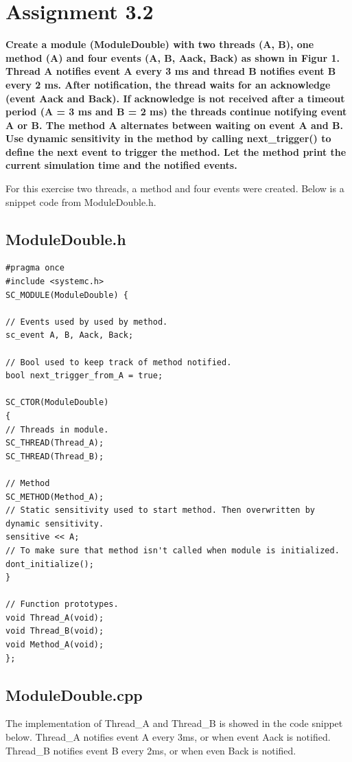 
\chapter{Assignment 3.2}

\textbf{Create a module (ModuleDouble) with two threads (A, B), one method (A) and four events (A,
	B, Aack, Back) as shown in Figur 1. Thread A notifies event A every 3 ms and thread B notifies
	event B every 2 ms. After notification, the thread waits for an acknowledge (event Aack and Back).
	If acknowledge is not received after a timeout period (A = 3 ms and B = 2 ms) the threads continue
	notifying event A or B. The method A alternates between waiting on event A and B. Use dynamic
	sensitivity in the method by calling next\_trigger() to define the next event to trigger the method.
	Let the method print the current simulation time and the notified events. 
}


For this exercise two threads, a method and four events were created. Below is a snippet code from ModuleDouble.h. 

\section{ModuleDouble.h}
\begin{lstlisting}
#pragma once
#include <systemc.h>
SC_MODULE(ModuleDouble) {

// Events used by used by method.
sc_event A, B, Aack, Back;

// Bool used to keep track of method notified.
bool next_trigger_from_A = true;

SC_CTOR(ModuleDouble)
{
// Threads in module.
SC_THREAD(Thread_A);
SC_THREAD(Thread_B);

// Method
SC_METHOD(Method_A);
// Static sensitivity used to start method. Then overwritten by dynamic sensitivity.
sensitive << A;
// To make sure that method isn't called when module is initialized.
dont_initialize();
}

// Function prototypes.
void Thread_A(void);
void Thread_B(void);
void Method_A(void);
};
\end{lstlisting}


\section{ModuleDouble.cpp}

The implementation of Thread\_A and Thread\_B is showed in the code snippet below. 
Thread\_A notifies event A every 3ms, or when event Aack is notified. 
Thread\_B notifies event B every 2ms, or when even Back is notified. 
 

